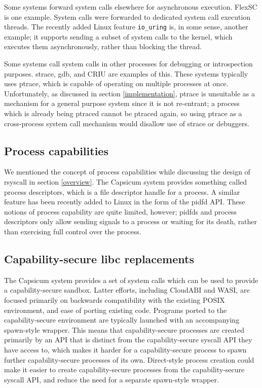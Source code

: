 \documentclass[sigplan]{acmart}
\begin{document}
Some systems forward system calls elsewhere for asynchronous execution.
FlexSC\cite{flexsc} is one example.
System calls were forwarded to dedicated system call execution threads.
The recently added Linux feature \verb|io_uring| is, in some sense, another example;
it supports sending a subset of system calls to the kernel,
which executes them asynchronously,
rather than blocking the thread.

Some systems call system calls in other processes for debugging or introspection purposes.
strace, gdb, and CRIU\cite{criu} are examples of this.
These systems typically uses ptrace,
which is capable of operating on multiple processes at once.
Unfortunately, as discussed in section \ref{implementation},
ptrace is unsuitable as a mechanism for a general purpose system since it is not re-entrant;
a process which is already being ptraced cannot be ptraced again,
so using ptrace as a cross-process system call mechanism would disallow use of strace or debuggers.
\subsection{Process capabilities}
We mentioned the concept of process capabilities while discussing the design of rsyscall in section \ref{overview}.
The Capsicum system provides something called process descriptors\cite{capsicum},
which is a file descriptor handle for a process.
A similar feature has been recently added to Linux in the form of the pidfd API\cite{pidfd}.
These notions of process capability are quite limited, however;
pidfds and process descriptors only allow sending signals to a process or waiting for its death,
rather than exercising full control over the process.
\subsection{Capability-secure libc replacements}
The Capsicum system provides a set of system calls
which can be used to provide a capability-secure sandbox.\cite{capsicum}
Latter efforts\cite{oblivious}, including CloudABI\cite{cloudabi} and WASI\cite{wasi},
are focused primarily on backwards compatibility with the existing POSIX environment, and ease of porting existing code.
Programs ported to the capability-secure environment
are typically launched with an accompanying spawn-style wrapper.
This means that capability-secure processes are created primarily by an API
that is distinct from the capability-secure syscall API they have access to,
which makes it harder for a capability-secure process to spawn further capability-secure processes of its own.
Direct-style process creation could make it easier to create capability-secure processes 
from the capability-secure syscall API,
and reduce the need for a separate spawn-style wrapper.
\end{document}

